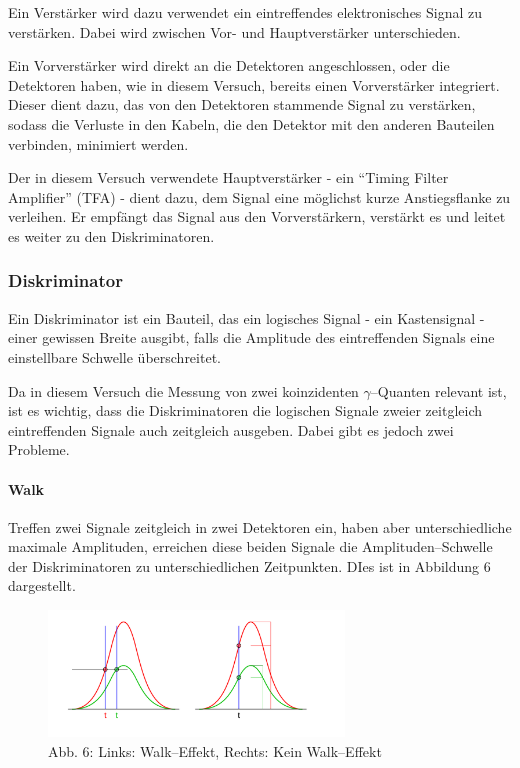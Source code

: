 \documentclass[12pt,a4paper]{scrartcl}
\numberwithin{equation}{section} %
\renewcommand{\[}{} %
\renewcommand{\]}{\noindent} %
\begin{document}
Ein Verstärker wird dazu verwendet ein eintreffendes elektronisches
Signal zu verstärken. Dabei wird zwischen Vor- und Hauptverstärker
unterschieden.

Ein Vorverstärker wird direkt an die Detektoren angeschlossen, oder die
Detektoren haben, wie in diesem Versuch, bereits einen Vorverstärker
integriert. Dieser dient dazu, das von den Detektoren stammende Signal
zu verstärken, sodass die Verluste in den Kabeln, die den Detektor mit
den anderen Bauteilen verbinden, minimiert werden.

Der in diesem Versuch verwendete Hauptverstärker - ein ``Timing Filter
Amplifier'' (TFA) - dient dazu, dem Signal eine möglichst kurze
Anstiegsflanke zu verleihen. Er empfängt das Signal aus den
Vorverstärkern, verstärkt es und leitet es weiter zu den
Diskriminatoren.

\hypertarget{diskriminator}{%
\subsubsection{Diskriminator}\label{diskriminator}}

Ein Diskriminator ist ein Bauteil, das ein logisches Signal - ein
Kastensignal - einer gewissen Breite ausgibt, falls die Amplitude des
eintreffenden Signals eine einstellbare Schwelle überschreitet.

Da in diesem Versuch die Messung von zwei koinzidenten
\(\gamma\)--Quanten relevant ist, ist es wichtig, dass die
Diskriminatoren die logischen Signale zweier zeitgleich eintreffenden
Signale auch zeitgleich ausgeben. Dabei gibt es jedoch zwei Probleme.

\hypertarget{walk}{%
\paragraph{Walk}\label{walk}}

Treffen zwei Signale zeitgleich in zwei Detektoren ein, haben aber
unterschiedliche maximale Amplituden, erreichen diese beiden Signale die
Amplituden--Schwelle der Diskriminatoren zu unterschiedlichen
Zeitpunkten. DIes ist in Abbildung \(6\) dargestellt.

\begin{figure}
	\centering
	\includegraphics[width=0.7\textwidth]{../media/B3.4/Constant_fraction_1.pdf}
	\caption{Abb. 6: Links: Walk--Effekt, Rechts: Kein Walk--Effekt}
	\label{abb:Walk-Effekt}
\end{figure}
\end{document}
